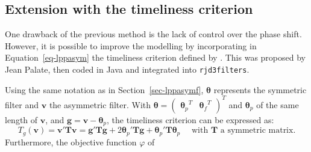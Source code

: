 \documentclass[
]{article}
\newcommand\transp[1]{{#1}^T}
\newcommand\1{\mathds{1}}
\begin{document}
\subsection{Extension with the timeliness
criterion}\label{sec-lptimeliness}

One drawback of the previous method is the lack of control over the
phase shift. However, it is possible to improve the modelling by
incorporating in Equation~\ref{eq-lppasym} the timeliness criterion
defined by \textcite{ch15HBSA}. This was proposed by Jean Palate, then
coded in Java and integrated into \texttt{rjd3filters}.

Using the same notation as in Section~\ref{sec-lppasymf},
\(\boldsymbol\theta\) represents the symmetric filter and
\(\boldsymbol v\) the asymmetric filter. With
\(\boldsymbol\theta=\transp{\begin{pmatrix}\transp{\boldsymbol\theta_p}&\transp{\boldsymbol\theta_f}\end{pmatrix}}\)
and \(\boldsymbol\theta_p\) of the same length of \(\boldsymbol v\), and
\(\boldsymbol g=\boldsymbol v-\boldsymbol \theta_p\), the timeliness
criterion can be expressed as: \[
T_g(\boldsymbol v)=\boldsymbol v'\boldsymbol T\boldsymbol v=\boldsymbol g'\boldsymbol T\boldsymbol g+2\boldsymbol \theta_p'\boldsymbol T\boldsymbol g+\boldsymbol \theta_p'\boldsymbol T\boldsymbol \theta_p
\quad\text{ with }\boldsymbol T\text{ a symmetric matrix}.
\] Furthermore, the objective function \(\varphi\) of
\end{document}
